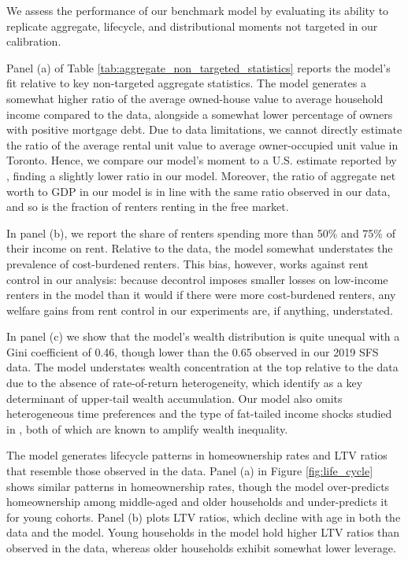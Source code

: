 \documentclass[parskip=full]{article}
\begin{document}
We assess the performance of our benchmark model by evaluating its ability to replicate aggregate, lifecycle, and distributional moments not targeted in our calibration. 

Panel (a) of Table \ref{tab:aggregate_non_targeted_statistics} reports the model's fit relative to key non-targeted aggregate statistics. The model generates a somewhat higher ratio of the average owned-house value to average household income compared to the data, alongside a somewhat lower percentage of owners with positive mortgage debt. Due to data limitations, we cannot directly estimate the ratio of the average rental unit value to average owner-occupied unit value in Toronto. Hence, we compare our model's moment to a U.S. estimate reported by \citet{chatterjee-eyigungor-2015}, finding a slightly lower ratio in our model. Moreover, the ratio of aggregate net worth to GDP in our model is in line with the same ratio observed in our data, and so is the fraction of renters renting in the free market.

In panel (b), we report the share of renters spending more than 50\% and 75\% of their income on rent. Relative to the data, the model somewhat understates the prevalence of cost-burdened renters. This bias, however, works against rent control in our analysis: because decontrol imposes smaller losses on low-income renters in the model than it would if there were more cost-burdened renters, any welfare gains from rent control in our experiments are, if anything, understated.

In panel (c) we show that the model's wealth distribution is quite unequal with a Gini coefficient of 0.46, though lower than the 0.65 observed in our 2019 SFS data. The model understates wealth concentration at the top relative to the data due to the absence of rate-of-return heterogeneity, which \citet{fagereng} identify as a key determinant of upper-tail wealth accumulation. Our model also omits heterogeneous time preferences \citep{ks-1998} and the type of fat-tailed income shocks studied in \citet{mj-shocks}, both of which are known to amplify wealth inequality.

The model generates lifecycle patterns in homeownership rates and LTV ratios that resemble those observed in the data. Panel (a) in Figure \ref{fig:life_cycle} shows similar patterns in homeownership rates, though the model over-predicts homeownership among middle-aged and older households and under-predicts it for young cohorts. Panel (b) plots LTV ratios, which decline with age in both the data and the model. Young households in the model hold higher LTV ratios than observed in the data, whereas older households exhibit somewhat lower leverage.
\end{document}
